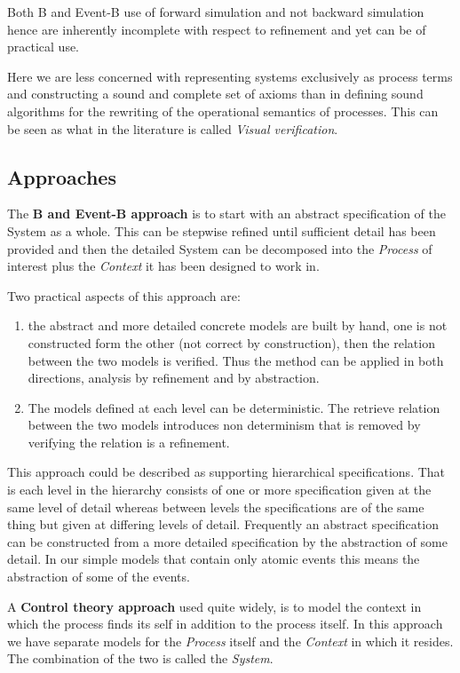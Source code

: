 \documentclass[]{article}
\begin{document}
Both B and Event-B  use of forward simulation and not backward simulation  hence are inherently incomplete with respect to refinement and yet  can be of practical use. 

Here we are less concerned with representing systems exclusively as process terms and constructing a sound and complete set of axioms  than in defining sound algorithms for the rewriting of the operational semantics of processes. This can be seen as what in the literature is called \emph{Visual verification}. 

\subsection{Approaches}
The {\bf B and  Event-B approach } is to start with an abstract specification of the System as a whole. This can be stepwise refined until sufficient detail has been provided and then the detailed System can be decomposed into the \emph{Process} of interest plus the \emph{Context} it has been designed to work in.

Two practical aspects of this approach are:
\begin{enumerate}
\item the abstract and more detailed concrete models are built by hand, one is not constructed form the other (not correct by construction), then the relation between the two models is verified. Thus the method can be applied in both directions, analysis by refinement and by abstraction.
\item The models defined at each level can be deterministic. The retrieve relation between the two models introduces non determinism that is removed by verifying the relation is a refinement.
\end{enumerate} 

This approach could be described as supporting hierarchical specifications. That is each level in the hierarchy  consists of one or more specification given at the same level of detail whereas between levels the specifications are of the same thing but given at differing levels of detail. Frequently an abstract specification can be constructed from a more detailed specification by the  abstraction of some detail. In our simple models that contain only atomic events this means the abstraction of some of the events.

A {\bf Control theory approach} used quite widely, is to model the context in which the process finds its self in addition to the process itself.  In this approach we have separate models for  the \emph{Process} itself and the \emph{Context} in which it resides. The combination of the two is called the \emph{System}.
\end{document}
